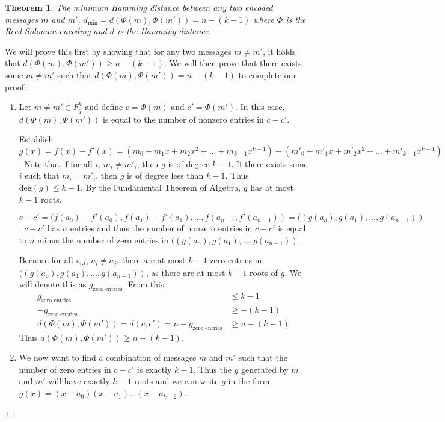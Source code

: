 \documentclass{article}
\newtheorem{theorem}{Theorem}
\newenvironment{proof}{\noindent{\em Proof:}}{$\Box$~\\}
\begin{document}
\begin{theorem}
    The minimum Hamming distance between any two encoded messages $m$ and $m'$, $d_\text{min}=d(\Phi(m),\Phi(m'))=n-(k-1)$ where $\Phi$ is the Reed-Solomon encoding and $d$ is the Hamming distance.
\end{theorem}

\begin{proof}
    We will prove this first by showing that for any two messages $m\neq m'$, it holds that $d(\Phi(m),\Phi(m'))\geq n-(k-1)$. We will then prove that there exists some $m\neq m'$ such that $d(\Phi(m),\Phi(m'))=n-(k-1)$ to complete our proof. 
    \begin{enumerate}
        \item Let $m\neq m'\in F_q^k$ and define $c=\Phi(m)$ and $c'=\Phi(m')$. In this case, $d(\Phi(m),\Phi(m'))$ is equal to the number of nonzero entries in $c-c'$.
        
        Establish $g(x)=f(x)-f'(x)=(m_0+m_1 x + m_2x^2 + \dots + m_{k-1}x^{k-1})-(m'_0+m'_1 x + m'_2x^2 + \dots + m'_{k-1}x^{k-1})=(m_0-m'_0)+(m_1-m'_1)x+\dots +(m_{k-1}-m'_{k-1})x^{k-1}$. Note that if for all $i$, $m_i\neq m'_i$, then $g$ is of degree $k-1$. If there exists some $i$ such that $m_i=m'_i$, then $g$ is of degree less than $k-1$. Thus $\text{deg}(g)\leq k-1$. By the Fundamental Theorem of Algebra, $g$ has at most $k-1$ roots.

        $c-c'=(f(a_0)-f'(a_0),f(a_1)-f'(a_1),\dots,f(a_{n-1},f'(a_{n-1}))=((g(a_o),g(a_1),\dots,g(a_{n-1}))$. $c-c'$ has $n$ entries and thus the number of nonzero entries in $c-c'$ is equal to $n$ minus the number of zero entries in $((g(a_o),g(a_1),\dots,g(a_{n-1}))$.

        Because for all $i,j$, $a_i\neq a_j$, there are at most $k-1$ zero entries in $((g(a_o),g(a_1),\dots,g(a_{n-1}))$, as there are at most $k-1$ roots of $g$. We will denote this as $g_\text{zero entries}$. From this,
        \begin{align*}
            g_\text{zero entries}&\leq k-1\\
            -g_\text{zero entries}&\geq -(k-1)\\
            d(\Phi(m),\Phi(m'))=d(c,c')=n-g_\text{zero entries}&\geq n-(k-1)
        \end{align*}
        Thus $d(\Phi(m),\Phi(m'))\geq n-(k-1)$.

        \item We now want to find a combination of messages $m$ and $m'$ such that the number of zero entries in $c-c'$ is exactly $k-1$. Thus the $g$ generated by $m$ and $m'$ will have exactly $k-1$ roots and we can write $g$ in the form $g(x)=(x-a_0)(x-a_1)\dots(x-a_{k-2})$. 
        

\end{enumerate}
\end{proof}
\end{document}
